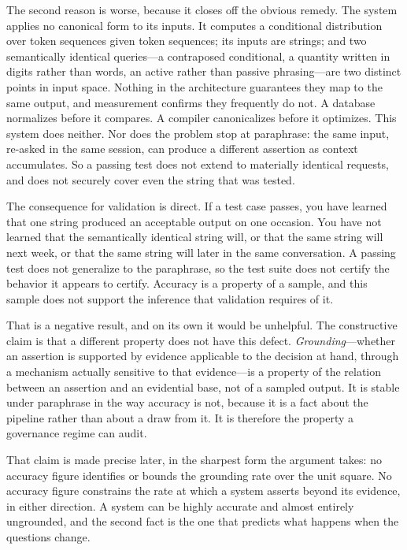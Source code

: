 The second reason is worse, because it closes off the obvious remedy. The
system applies no canonical form to its inputs. It computes a conditional distribution over token sequences given
token sequences; its inputs are strings; and two semantically identical
queries---a contraposed conditional, a quantity written in digits rather than
words, an active rather than passive phrasing---are two distinct points in input
space. Nothing in the architecture guarantees they map to the same output, and
measurement confirms they frequently do not. A database normalizes before it
compares. A compiler canonicalizes before it optimizes. This system does
neither. Nor does the problem stop at paraphrase: the same input, re-asked in the
same session, can produce a different assertion as context accumulates. So a
passing test does not extend to materially identical requests, and does not
securely cover even the string that was tested.

The consequence for validation is direct. If a test case passes, you have
learned that one string produced an acceptable output on one occasion. You have
not learned that the semantically identical string will, or that the same string
will next week, or that the same string will later in the same conversation. A
passing test does not generalize to the paraphrase, so the test suite does not
certify the behavior it appears to certify. Accuracy is a property of a sample,
and this sample does not support the inference that validation requires of it.

That is a negative result, and on its own it would be unhelpful. The
constructive claim is that a different property does not have this defect.
\emph{Grounding}---whether an assertion is supported by evidence applicable to
the decision at hand, through a mechanism actually sensitive to that
evidence---is a property of the relation between an assertion and an evidential
base, not of a sampled output. It is stable under paraphrase in the way accuracy
is not, because it is a fact about the pipeline rather than about a draw from it.
It is therefore the property a governance regime can audit.

That claim is made precise later, in the sharpest form the argument takes: no
accuracy figure identifies or bounds the grounding rate over the unit square. No accuracy figure constrains the rate at which a system asserts
beyond its evidence, in either direction. A system can be highly accurate and
almost entirely ungrounded, and the second fact is the one that predicts what
happens when the questions change.

